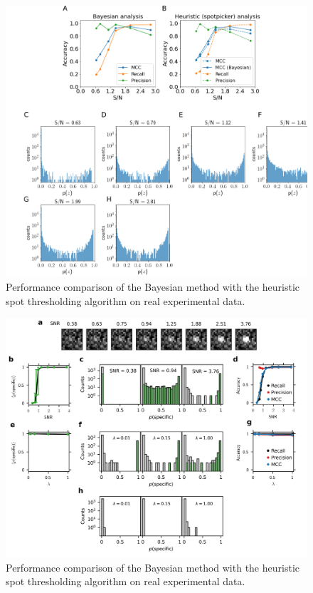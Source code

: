 \begin{figure}
\includegraphics[width=\linewidth]{figures/figure4/figure4.png}
\caption{Performance comparison of the Bayesian method with the heuristic spot thresholding algorithm on real experimental data.}
\label{fig:real_data}
\end{figure}

\begin{figure}
\includegraphics[width=\linewidth]{figures/figure5/figure5.png}
\caption{Performance comparison of the Bayesian method with the heuristic spot thresholding algorithm on real experimental data.}
\label{fig:real_data}
\end{figure}

